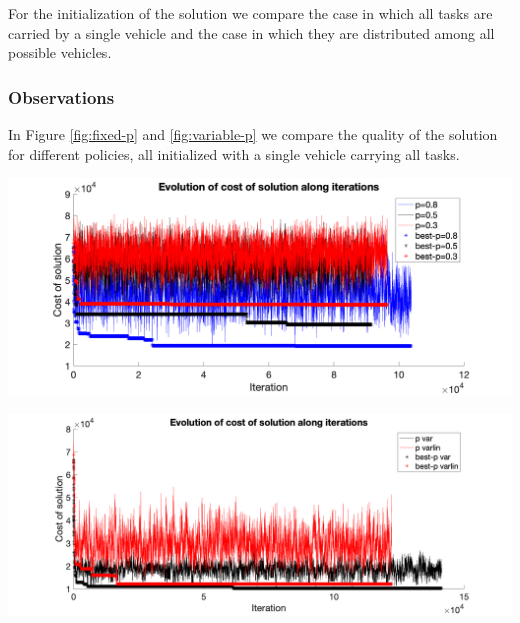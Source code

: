 \documentclass[11pt]{article}
\begin{document}
For the initialization of the solution we compare the case in which all tasks are carried by a single vehicle and the case in which they are distributed among all possible vehicles.

\subsubsection{Observations}
In Figure \ref{fig:fixed-p} and \ref{fig:variable-p} we compare the quality of the solution for different policies, all initialized with a single vehicle carrying all tasks. 

\begin{minipage}{.4\textwidth}
\centering
\includegraphics[width=\textwidth]{plots-centralized/evolution-fixed.png}
\label{fig:fixed-p}

\includegraphics[width=\textwidth]{plots-centralized/evolution-variable.png}
\label{fig:variable-p}

\end{minipage}
\end{document}
